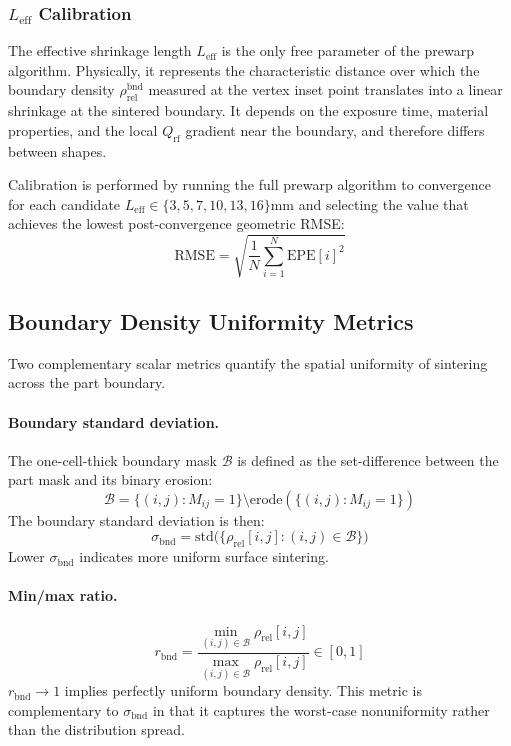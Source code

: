 \documentclass[10pt,twocolumn]{article}
\newcommand{\Qrf}{Q_{\mathrm{rf}}}
\newcommand{\bndstd}{\sigma_{\mathrm{bnd}}}
\newcommand{\Leff}{L_{\mathrm{eff}}}
\newcommand{\rhorel}{\rho_{\mathrm{rel}}}
\newcommand{\RMSE}{\mathrm{RMSE}}
\newcommand{\EPE}{\mathrm{EPE}}
\begin{document}
\subsubsection{$\Leff$ Calibration}
\label{sec:leff_calibration}

The effective shrinkage length $\Leff$ is the only free parameter of
the prewarp algorithm.  Physically, it represents the characteristic
distance over which the boundary density $\rhorel^{\mathrm{bnd}}$
measured at the vertex inset point translates into a linear shrinkage
at the sintered boundary.  It depends on the exposure time, material
properties, and the local $\Qrf$ gradient near the boundary, and
therefore differs between shapes.

Calibration is performed by running the full prewarp algorithm to
convergence for each candidate $\Leff \in \{3, 5, 7, 10, 13, 16\}
\si{\milli\meter}$ and selecting the value that achieves the lowest
post-convergence geometric RMSE:
\begin{equation}
  \RMSE = \sqrt{\frac{1}{N}\sum_{i=1}^{N}\EPE[i]^{2}}
  \label{eq:rmse}
\end{equation}

\subsection{Boundary Density Uniformity Metrics}
\label{sec:uniformity_metrics}

Two complementary scalar metrics quantify the spatial uniformity of
sintering across the part boundary.

\paragraph{Boundary standard deviation.}
The one-cell-thick boundary mask $\mathcal{B}$ is defined as the
set-difference between the part mask and its binary erosion:
\begin{equation}
  \mathcal{B} = \{(i,j) : M_{ij} = 1\} \setminus
                \mathrm{erode}(\{(i,j) : M_{ij} = 1\})
  \label{eq:boundary_mask}
\end{equation}
The boundary standard deviation is then:
\begin{equation}
  \bndstd = \mathrm{std}\bigl(\{\rhorel[i,j] : (i,j)\in\mathcal{B}\}\bigr)
  \label{eq:bnd_std}
\end{equation}
Lower $\bndstd$ indicates more uniform surface sintering.

\paragraph{Min/max ratio.}
\begin{equation}
  r_{\mathrm{bnd}} = \frac{\min_{(i,j)\in\mathcal{B}}\rhorel[i,j]}
                         {\max_{(i,j)\in\mathcal{B}}\rhorel[i,j]}
  \in [0, 1]
  \label{eq:minmax_ratio}
\end{equation}
$r_{\mathrm{bnd}} \to 1$ implies perfectly uniform boundary density.
This metric is complementary to $\bndstd$ in that it captures the
worst-case nonuniformity rather than the distribution spread.
\end{document}
